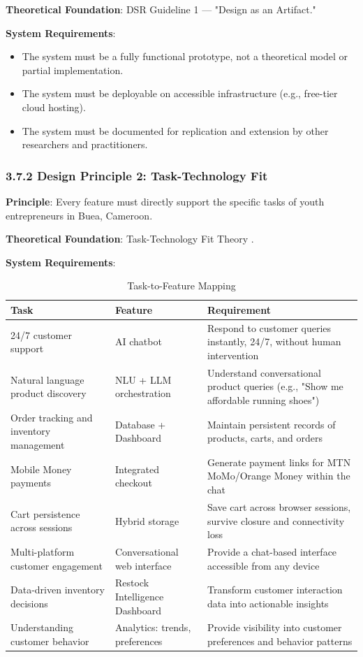 \documentclass[12pt,a4paper]{article}
\begin{document}
\textbf{Theoretical Foundation}: DSR Guideline 1 \citep{hevner2004} --- "Design as an Artifact."

\textbf{System Requirements}:

\begin{itemize}
    \item The system must be a fully functional prototype, not a theoretical model or partial implementation.
    \item The system must be deployable on accessible infrastructure (e.g., free-tier cloud hosting).
    \item The system must be documented for replication and extension by other researchers and practitioners.
\end{itemize}

\subsubsection{3.7.2 Design Principle 2: Task-Technology Fit}

\textbf{Principle}: Every feature must directly support the specific tasks of youth entrepreneurs in Buea, Cameroon.

\textbf{Theoretical Foundation}: Task-Technology Fit Theory \citep{goodhue1995}.

\textbf{System Requirements}:

\begin{table}[h]
\centering
\caption{Task-to-Feature Mapping}
\label{tab:task_feature}
\begin{tabular}{p{5cm}p{5cm}p{5cm}}
\toprule
\textbf{Task} & \textbf{Feature} & \textbf{Requirement} \\
\midrule
24/7 customer support & AI chatbot & Respond to customer queries instantly, 24/7, without human intervention \\
Natural language product discovery & NLU + LLM orchestration & Understand conversational product queries (e.g., "Show me affordable running shoes") \\
Order tracking and inventory management & Database + Dashboard & Maintain persistent records of products, carts, and orders \\
Mobile Money payments & Integrated checkout & Generate payment links for MTN MoMo/Orange Money within the chat \\
Cart persistence across sessions & Hybrid storage & Save cart across browser sessions, survive closure and connectivity loss \\
Multi-platform customer engagement & Conversational web interface & Provide a chat-based interface accessible from any device \\
Data-driven inventory decisions & Restock Intelligence Dashboard & Transform customer interaction data into actionable insights \\
Understanding customer behavior & Analytics: trends, preferences & Provide visibility into customer preferences and behavior patterns \\
\bottomrule
\end{tabular}
\end{table}
\end{document}
